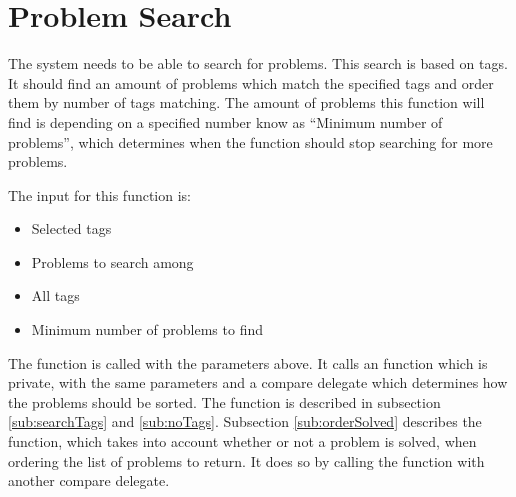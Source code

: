 \section{Problem Search}
\label{sec:search}
The system needs to be able to search for problems.
This search is based on tags.
It should find an amount of problems which match the specified tags and order them by number of tags matching.
The amount of problems this function will find is depending on a specified number know as ``Minimum number of problems'', which determines when the function should stop searching for more problems.

The input for this function is:

\begin{itemize}
	\item Selected tags
	\item Problems to search among
	\item All tags
	\item Minimum number of problems to find
\end{itemize}

The  function is called with the parameters above. It calls an  function which is private, with the same parameters and a compare delegate which determines how the problems should be sorted.
The  function is described in subsection \ref{sub:searchTags} and \ref{sub:noTags}.
Subsection \ref{sub:orderSolved} describes the  function, which takes into account whether or not a problem is solved, when ordering the list of problems to return.
It does so by calling the  function with another compare delegate.

